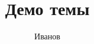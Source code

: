 \documentclass{beamer}
\title{Демо темы}
\author{Иванов}
\begin{document}
\begin{frame}\titlepage\end{frame}
\end{document}
